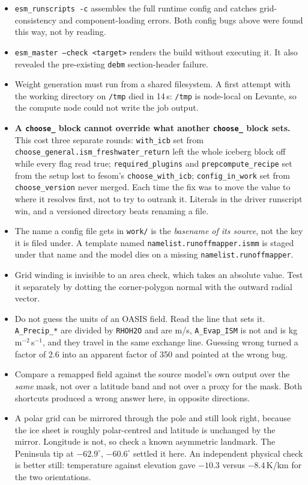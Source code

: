 \documentclass[11pt,a4paper]{article}
\newcommand{\code}[1]{\texttt{\small #1}}
\begin{document}
\begin{itemize}
\item \code{esm\_runscripts -c} assembles the full runtime config and catches grid-consistency and
      component-loading errors. Both config bugs above were found this way, not by reading.
\item \code{esm\_master --check <target>} renders the build without executing it. It also revealed
      the pre-existing \code{debm} section-header failure.
\item Weight generation must run from a shared filesystem. A first attempt with the working
      directory on \code{/tmp} died in 14\,s: \code{/tmp} is node-local on Levante, so the compute
      node could not write the job output.
\item \textbf{A \code{choose\_} block cannot override what another \code{choose\_} block sets.}
      This cost three separate rounds: \code{with\_icb} set from
      \code{choose\_general.ism\_freshwater\_return} left the whole iceberg block off while every
      flag read true; \code{required\_plugins} and \code{prepcompute\_recipe} set from the setup
      lost to fesom's \code{choose\_with\_icb}; \code{config\_in\_work} set from
      \code{choose\_version} never merged. Each time the fix was to move the value to where it
      resolves first, not to try to outrank it. Literals in the driver runscript win, and a
      versioned directory beats renaming a file.
\item The name a config file gets in \code{work/} is the \emph{basename of its source}, not the key
      it is filed under. A template named \code{namelist.runoffmapper.ismm} is staged under that
      name and the model dies on a missing \code{namelist.runoffmapper}.
\item Grid winding is invisible to an area check, which takes an absolute value. Test it
      separately by dotting the corner-polygon normal with the outward radial vector.
\item Do not guess the units of an OASIS field. Read the line that sets it.
      \code{A\_Precip\_*} are divided by \code{RHOH2O} and are m/s, \code{A\_Evap\_ISM} is not and
      is kg\,m$^{-2}$\,s$^{-1}$, and they travel in the same exchange line. Guessing wrong turned
      a factor of 2.6 into an apparent factor of 350 and pointed at the wrong bug.
\item Compare a remapped field against the source model's own output over the \emph{same} mask,
      not over a latitude band and not over a proxy for the mask. Both shortcuts produced a wrong
      answer here, in opposite directions.
\item A polar grid can be mirrored through the pole and still look right, because the ice sheet is
      roughly polar-centred and latitude is unchanged by the mirror. Longitude is not, so check a
      known asymmetric landmark. The Peninsula tip at $-62.9^\circ$, $-60.6^\circ$ settled it here.
      An independent physical check is better still: temperature against elevation gave $-10.3$
      versus $-8.4$\,K/km for the two orientations.
\end{itemize}
\end{document}
